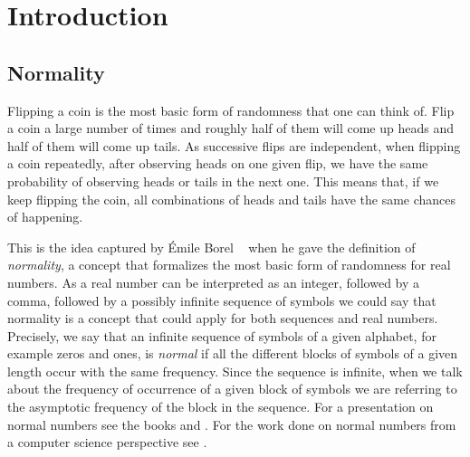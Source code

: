 \documentclass[11pt,a4paper]{tesis}
\begin{document}

\def\autor{Lucas Manuel Puterman Colomer}
\def\tituloTesis{Números Muy Normales}
\def\runtitulo{Números Muy Normales}
\def\runtitle{Very Normal Numbers}
\def\director{Dra. Verónica Becher}
\def\codirector{Olivier Carton}
\def\lugar{Buenos Aires,\today}
\def\libreta{830/13}
\def\email{lputerman@dc.com.ar}


\frontmatter
\pagestyle{empty}


\cleardoublepage


\cleardoublepage

\cleardoublepage
\tableofcontents

\mainmatter
\pagestyle{headings}


\chapter{Introduction}


\section{Normality}

Flipping a coin is the most basic form of randomness that one can think of. Flip a coin a large number of times and roughly half of them will come up heads and half of them will come up tails.
As successive flips are independent, when flipping a coin repeatedly, after observing heads on one given flip, we have the same probability of observing heads or tails in the next one. This means that, if we keep flipping the coin, all combinations of heads and tails have the same chances of happening.

This is the idea captured by Émile Borel  ~\cite{Borel} when he gave 
the definition of \textit{normality}, a concept that formalizes  
the most basic form of randomness for real numbers. 
As a real number can be interpreted as an integer, followed by a comma, followed by a possibly infinite sequence of symbols we could say that normality is a concept that could apply for both sequences and real numbers.
Precisely, we say that an infinite sequence of symbols of a given alphabet, for example zeros and ones, is \textit{normal} if all the different blocks of symbols of a given length occur with the same
  frequency.
Since the sequence is infinite, 
when we talk about the frequency of occurrence of a given block of symbols 
we are referring to the asymptotic frequency of the block in the sequence.
For a presentation on normal numbers see the books  \cite{kuipers} and \cite{bugeaud}. 
For the work done on normal numbers from a computer science perspective see \cite{BC2018}.
\end{document}
